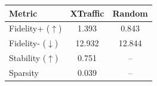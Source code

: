 \begin{tabular}{lcc}
\toprule
Metric & XTraffic & Random \\
\midrule
Fidelity+ ($\uparrow$) & 1.393 & 0.843 \\
Fidelity- ($\downarrow$) & 12.932 & 12.844 \\
Stability ($\uparrow$) & 0.751 & -- \\
Sparsity & 0.039 & -- \\
\bottomrule
\end{tabular}
